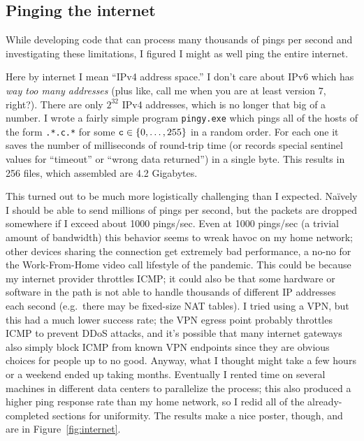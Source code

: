 \documentclass[twocolumn]{article}
\begin{document}
\subsection{Pinging the internet} \label{sec:ping-internet}

While developing code that can process many thousands of pings per second
and investigating these limitations, I figured I might as well ping the
entire internet.

Here by internet I mean ``IPv4 address space.'' I don't care about
IPv6 which has {\it way too many addresses} (plus like, call me when
you are at least version 7, right?). There are only $2^{32}$ IPv4
addresses, which is no longer that big of a number. I wrote a fairly
simple program {\tt pingy.exe} which pings all of the hosts of the
form {\tt *.*.c.*} for some ${\tt c} \in \{0,\ldots,255\}$ in a random
order. For each one it saves the number of milliseconds of round-trip
time (or records special sentinel values for ``timeout'' or ``wrong
data returned'') in a single byte. This results in 256 files, which
assembled are 4.2 Gigabytes.

This turned out to be much more logistically challenging than I
expected. Na\"ively I should be able to send millions of pings per
second, but the packets are dropped somewhere if I exceed about 1000
pings/sec. Even at 1000 pings/sec (a trivial amount of bandwidth) this
behavior seems to wreak havoc on my home network; other devices
sharing the connection get extremely bad performance, a no-no for the
Work-From-Home video call lifestyle of the pandemic. This could be because
my internet provider throttles ICMP; it could also be that some
hardware or software in the path is not able to handle thousands of
different IP addresses each second (e.g.~there may be fixed-size NAT
tables). I tried using a VPN, but this had a much lower success rate;
the VPN egress point probably throttles ICMP to prevent DDoS attacks,
and it's possible that many internet gateways also simply block ICMP
from known VPN endpoints since they are obvious choices for people up
to no good. Anyway, what I thought might take a few hours or a weekend
ended up taking months. Eventually I rented time on several machines
in different data centers to parallelize the process; this also
produced a higher ping response rate than my home network, so I redid
all of the already-completed sections for uniformity. The results make
a nice poster, though, and are in Figure~\ref{fig:internet}.
\end{document}
